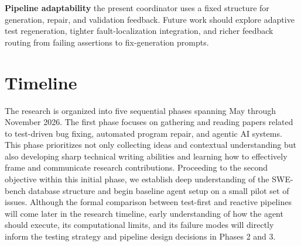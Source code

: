 \documentclass[12pt]{article}
\begin{document}
\textbf{Pipeline adaptability} the present coordinator uses a fixed structure for generation, repair, and validation feedback. Future work should explore adaptive test regeneration, tighter fault-localization integration, and richer feedback routing from failing assertions to fix-generation prompts.



\section{Timeline}
The research is organized into five sequential phases spanning May through November 2026. The first phase focuses on gathering and reading papers related to test-driven bug fixing, automated program repair, and agentic AI systems. This phase prioritizes not only collecting ideas and contextual understanding but also developing sharp technical writing abilities and learning how to effectively frame and communicate research contributions. Proceeding to the second objective within this initial phase, we establish deep understanding of the SWE-bench database structure and begin baseline agent setup on a small pilot set of issues. Although the formal comparison between test-first and reactive pipelines will come later in the research timeline, early understanding of how the agent should execute, its computational limits, and its failure modes will directly inform the testing strategy and pipeline design decisions in Phases 2 and 3.
\end{document}
